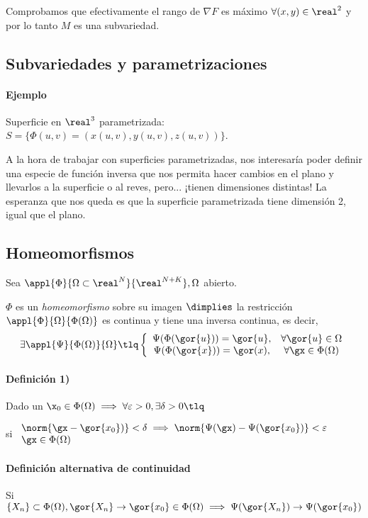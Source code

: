 Comprobamos que efectivamente el rango de $\nabla F$ es máximo $\forall (x,y)\in \real^2$ y por lo tanto $M$ es una subvariedad.

\subsection{Subvariedades y parametrizaciones}
\paragraph{Ejemplo} Superficie en $\real^3$ parametrizada: $S = \{\Phi(u,v) = (x(u,v),y(u,v),z(u,v))\}$.

A la hora de trabajar con superficies parametrizadas, nos interesaría poder definir una especie de función inversa que nos permita hacer cambios en el plano y llevarlos a la superficie o al reves, pero... ¡tienen dimensiones distintas! La esperanza que nos queda es que la superficie parametrizada tiene dimensión 2, igual que el plano.


\subsection{Homeomorfismos}
\begin{defn}[Homeomorfismo]
Sea $\appl{\Phi}{\Omega\subset\real^N}{\real^{N+K}}, \Omega$ abierto.

$\Phi$ es un \emph{homeomorfismo} sobre su imagen $\dimplies $ la restricción $\appl{\Phi}{\Omega}{\Phi(\Omega)}$ es continua y tiene una inversa continua,
es decir, \[\exists \appl{\Psi}{\Phi(\Omega)}{\Omega} \tlq 
\left\{ \begin{array}{cc} 
\Psi(\Phi(\gor{u})) = \gor{u}, &\forall \gor{u} \in \Omega\\ 
\Psi(\Phi(\gor{x})) = \gor(x), &\forall \gx \in \Phi(\Omega)
\end{array}\right.\]

\paragraph{Definición 1)}
Dado un $\displaystyle \x_0 \in \Phi(\Omega) \implies \forall \varepsilon >0, \exists \delta>0 \tlq$ 

si $\begin{array}{lc}
\norm{\gx-\gor{x_0})} < \delta \implies \norm{\Psi(\gx)-\Psi(\gor{x_0})}<\varepsilon\\
\gx \in \Phi(\Omega)
\end{array}$

\paragraph{Definición alternativa de continuidad}
Si $\{X_n\}\subset\Phi(\Omega), \gor{X_n} \rightarrow \gor{x_0}\in\Phi(\Omega) \implies \Psi(\gor{X_n}) \rightarrow \Psi(\gor{x_0})$

\end{defn}

